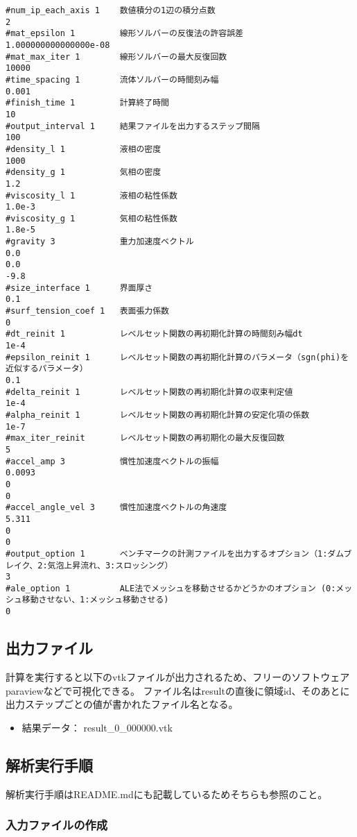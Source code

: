 \begin{lstlisting}[caption = cond.dat]
#num_ip_each_axis 1    数値積分の1辺の積分点数
2                        
#mat_epsilon 1         線形ソルバーの反復法の許容誤差
1.000000000000000e-08    
#mat_max_iter 1        線形ソルバーの最大反復回数
10000                    
#time_spacing 1        流体ソルバーの時間刻み幅
0.001                    
#finish_time 1         計算終了時間
10                       
#output_interval 1     結果ファイルを出力するステップ間隔
100
#density_l 1           液相の密度
1000
#density_g 1           気相の密度
1.2
#viscosity_l 1         液相の粘性係数
1.0e-3
#viscosity_g 1         気相の粘性係数
1.8e-5
#gravity 3             重力加速度ベクトル
0.0
0.0
-9.8
#size_interface 1      界面厚さ
0.1
#surf_tension_coef 1   表面張力係数
0
#dt_reinit 1           レベルセット関数の再初期化計算の時間刻み幅dt
1e-4
#epsilon_reinit 1      レベルセット関数の再初期化計算のパラメータ（sgn(phi)を近似するパラメータ）
0.1
#delta_reinit 1        レベルセット関数の再初期化計算の収束判定値
1e-4
#alpha_reinit 1        レベルセット関数の再初期化計算の安定化項の係数 
1e-7
#max_iter_reinit       レベルセット関数の再初期化の最大反復回数
5
#accel_amp 3           慣性加速度ベクトルの振幅
0.0093
0
0
#accel_angle_vel 3     慣性加速度ベクトルの角速度
5.311
0
0
#output_option 1       ベンチマークの計測ファイルを出力するオプション（1:ダムブレイク、2:気泡上昇流れ、3:スロッシング）
3
#ale_option 1          ALE法でメッシュを移動させるかどうかのオプション (0:メッシュ移動させない、1:メッシュ移動させる)
0
\end{lstlisting}

\subsection{出力ファイル}

計算を実行すると以下のvtkファイルが出力されるため、フリーのソフトウェアparaviewなどで可視化できる。
ファイル名はresultの直後に領域id、そのあとに出力ステップごとの値が書かれたファイル名となる。
\begin{itemize}
	\item 結果データ： result\_0\_000000.vtk
\end{itemize}

\subsection{解析実行手順}
解析実行手順はREADME.mdにも記載しているためそちらも参照のこと。

\subsubsection{入力ファイルの作成}

